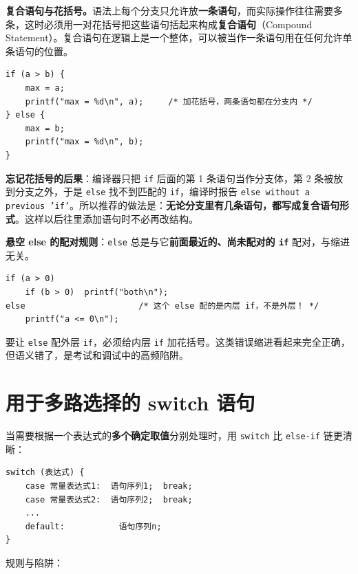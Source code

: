 \textbf{复合语句与花括号。}语法上每个分支只允许放\textbf{一条语句}，而实际操作往往需要多条，这时必须用一对花括号把这些语句括起来构成\textbf{复合语句}（Compound Statement）。复合语句在逻辑上是一个整体，可以被当作一条语句用在任何允许单条语句的位置。

\begin{lstlisting}
if (a > b) {
    max = a;
    printf("max = %d\n", a);     /* 加花括号，两条语句都在分支内 */
} else {
    max = b;
    printf("max = %d\n", b);
}
\end{lstlisting}

\textbf{忘记花括号的后果}：编译器只把 \texttt{if} 后面的第 1 条语句当作分支体，第 2 条被放到分支之外，于是 \texttt{else} 找不到匹配的 \texttt{if}，编译时报告 \texttt{else without a previous 'if'}。所以推荐的做法是：\textbf{无论分支里有几条语句，都写成复合语句形式}。这样以后往里添加语句时不必再改结构。

\textbf{悬空 else 的配对规则}：\texttt{else} 总是与它\textbf{前面最近的、尚未配对的 \texttt{if}} 配对，与缩进无关。

\begin{lstlisting}
if (a > 0)
    if (b > 0)  printf("both\n");
else                       /* 这个 else 配的是内层 if，不是外层！ */
    printf("a <= 0\n");
\end{lstlisting}

要让 \texttt{else} 配外层 \texttt{if}，必须给内层 \texttt{if} 加花括号。这类错误缩进看起来完全正确，但语义错了，是考试和调试中的高频陷阱。

\section{用于多路选择的 switch 语句}

当需要根据一个表达式的\textbf{多个确定取值}分别处理时，用 \texttt{switch} 比 \texttt{else-if} 链更清晰：

\begin{lstlisting}
switch (表达式) {
    case 常量表达式1:  语句序列1;  break;
    case 常量表达式2:  语句序列2;  break;
    ...
    default:           语句序列n;
}
\end{lstlisting}

规则与陷阱：

